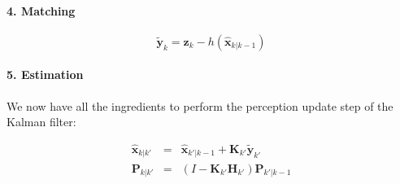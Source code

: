 


\paragraph{4. Matching}
\begin{equation}
\tilde{\boldsymbol{y}}_{k}=\boldsymbol{z}_{k}-h(\hat{\boldsymbol{x}}_{k|k-1})
\end{equation}


\paragraph{5. Estimation}
We now have all the ingredients to perform the perception update step of the Kalman filter:

\begin{eqnarray}
\hat{\boldsymbol{x}}_{k|k'} &=& \hat{\boldsymbol{x}}_{k'|k-1} + \boldsymbol{K}_{k'}\tilde{\boldsymbol{y}}_{k'}\\
\boldsymbol{P}_{k|k'} &=& (I - \boldsymbol{K}_{k'} {\boldsymbol{H}_{k'}}) \boldsymbol{P}_{k'|k-1}
\end{eqnarray}


